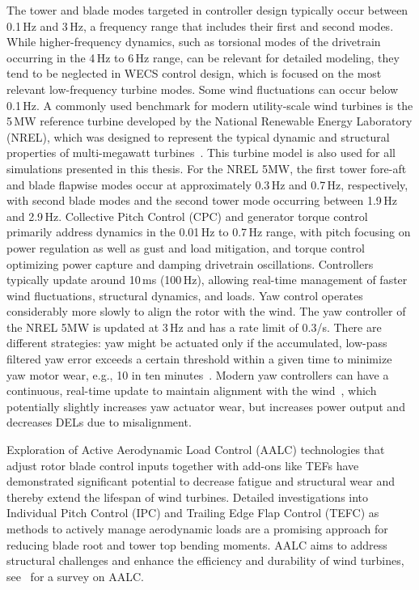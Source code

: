 The tower and blade modes targeted in controller design typically occur between 0.1\,Hz and 3\,Hz, a frequency range that includes their first and second modes. While higher-frequency dynamics, such as torsional modes of the drivetrain occurring in the 4\,Hz to 6\,Hz range, can be relevant for detailed modeling, they tend to be neglected in WECS control design, which is focused on the most relevant low-frequency turbine modes. Some wind fluctuations can occur below 0.1\,Hz. A commonly used benchmark for modern utility-scale wind turbines is the 5\,MW reference turbine developed by the National Renewable Energy Laboratory (NREL), which was designed to represent the typical dynamic and structural properties of multi-megawatt turbines~\cite{jonkman2009definition}. This turbine model is also used for all simulations presented in this thesis. For the NREL 5MW, the first tower fore-aft and blade flapwise modes occur at approximately 0.3\,Hz and 0.7\,Hz, respectively, with second blade modes and the second tower mode occurring between 1.9\,Hz and 2.9\,Hz. Collective Pitch Control (CPC) and generator torque control primarily address dynamics in the 0.01\,Hz to 0.7\,Hz range, with pitch focusing on power regulation as well as gust and load mitigation, and torque control optimizing power capture and damping drivetrain oscillations. Controllers typically update around 10\,ms (100\,Hz), allowing real-time management of faster wind fluctuations, structural dynamics, and loads. Yaw control operates considerably more slowly to align the rotor with the wind. The yaw controller of the NREL 5MW is updated at 3\,Hz and has a rate limit of 0.3\textdegree/s. There are different strategies: yaw might be actuated only if the accumulated, low-pass filtered yaw error exceeds a certain threshold within a given time to minimize yaw motor wear, e.g., 10\textdegree{} in ten minutes~\cite{fleming2014yawmisalignment}. Modern yaw controllers can have a continuous, real-time update to maintain alignment with the wind~\cite{stanley2022yawoptimization}, which potentially slightly increases yaw actuator wear, but increases power output and decreases DELs due to misalignment.

Exploration of Active Aerodynamic Load Control (AALC) technologies that adjust rotor blade control inputs together with add-ons like TEFs have demonstrated significant potential to decrease fatigue and structural wear and thereby extend the lifespan of wind turbines. Detailed investigations into Individual Pitch Control (IPC) and Trailing Edge Flap Control (TEFC) as methods to actively manage aerodynamic loads are a promising approach for reducing blade root and tower top bending moments. AALC aims to address structural challenges and enhance the efficiency and durability of wind turbines, see~\cite{aubrun2017review} for a survey on AALC.

